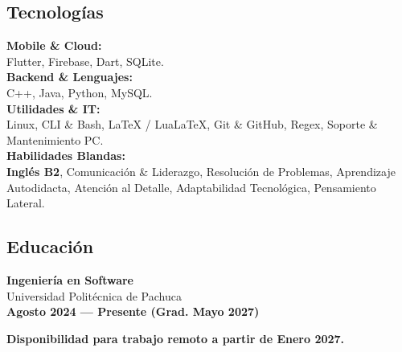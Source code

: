 \documentclass[10pt,a4paper]{article}
\begin{document}
\begin{minipage}[t]{0.48\textwidth}

\begin{tcolorbox}[cvcard]
\section*{Tecnologías}
\textbf{Mobile \& Cloud:}\\
{\color{textmuted} Flutter, Firebase, Dart, SQLite.}\\[0.6em]
\textbf{Backend \& Lenguajes:}\\
{\color{textmuted} C++, Java, Python, MySQL.}\\[0.6em]
\textbf{Utilidades \& IT:}\\
{\color{textmuted} Linux, CLI \& Bash, LaTeX / LuaLaTeX, Git \& GitHub, Regex, Soporte \& Mantenimiento PC.}\\[0.6em]
\textbf{Habilidades Blandas:}\\
{\color{accent}\bfseries Inglés B2}, {\color{textmuted} Comunicación \& Liderazgo, Resolución de Problemas, Aprendizaje Autodidacta, Atención al Detalle, Adaptabilidad Tecnológica, Pensamiento Lateral.}
\end{tcolorbox}

\vspace{1em}

\begin{tcolorbox}[cvcard]
\section*{Educación}
\textbf{\large Ingeniería en Software}\\[0.1em]
{\color{textmuted}Universidad Politécnica de Pachuca}\\[0.1em]
{\color{accent} \bfseries Agosto 2024 — Presente (Grad. Mayo 2027)}

\vspace{0.8em}
\begin{tcolorbox}[enhanced, colback=accentlight, colframe=accent, boxrule=0pt, leftrule=4pt, arc=3pt, boxsep=0pt, left=8pt, right=8pt, top=6pt, bottom=6pt]
\textbf{Disponibilidad para trabajo remoto a partir de Enero 2027.}
\end{tcolorbox}
\end{tcolorbox}

\end{minipage}\hfill
\end{document}

